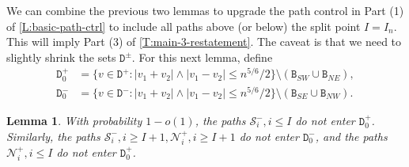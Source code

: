\documentclass[11pt,twoside]{amsart}
\theoremstyle{plain}
\newtheorem{lem}[thm]{Lemma}
\numberwithin{quest}{section}
\theoremstyle{remark}
\numberwithin{rem}{section}
\theoremstyle{definition}
\newcommand{\cS}{\mathcal{S}}
\newcommand{\cN}{\mathcal{N}}
\renewcommand{\tt}[1]{{\mathtt{#1}}}
\begin{document}
	We can combine the previous two lemmas to upgrade the path control in Part (1) of \cref{L:basic-path-ctrl} to include all paths above (or below) the split point $I = I_n$. This will imply Part (3) of \cref{T:main-3-restatement}. The caveat is that we need to slightly shrink the sets $\tt{D}^\pm$. For this next lemma, define
	\begin{align*}
		\tt{D}^+_0 &= \{v  \in \tt{D}^+ : |v_1 + v_2| \wedge |v_1 - v_2| \le n^{5/6}/2\} \setminus (\tt{B}_{SW} \cup \tt{B}_{NE}), \\
		\tt{D}^-_0 &= \{v  \in \tt{D}^- : |v_1 + v_2| \wedge |v_1 - v_2| \le n^{5/6}/2\} \setminus (\tt{B}_{SE} \cup \tt{B}_{NW}).
	\end{align*}
	\begin{lem}
		\label{L:QSE-pass}
		With probability $1 - o(1)$, the paths $\cS_i^-, i \le I$ do not enter $\tt{D}^+_0$. Similarly, the paths $\cS_i^-, i \ge I + 1, \cN_i^+, i \ge I + 1$ do not enter $\tt{D}^-_0$, and the paths $\cN_i^+, i \le I$ do not enter $\tt{D}^+_0$.
	\end{lem}
	
\end{document}
